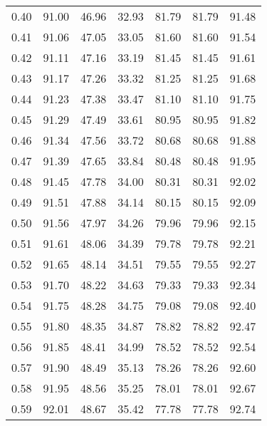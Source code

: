 \begin{tabular}{|c|c|c|c|c|c|c|}
      0.40 &     91.00 &     46.96 &      32.93 &   81.79 &      81.79 &         91.48 \\
      0.41 &     91.06 &     47.05 &      33.05 &   81.60 &      81.60 &         91.54 \\
      0.42 &     91.11 &     47.16 &      33.19 &   81.45 &      81.45 &         91.61 \\
      0.43 &     91.17 &     47.26 &      33.32 &   81.25 &      81.25 &         91.68 \\
      0.44 &     91.23 &     47.38 &      33.47 &   81.10 &      81.10 &         91.75 \\
      0.45 &     91.29 &     47.49 &      33.61 &   80.95 &      80.95 &         91.82 \\
      0.46 &     91.34 &     47.56 &      33.72 &   80.68 &      80.68 &         91.88 \\
      0.47 &     91.39 &     47.65 &      33.84 &   80.48 &      80.48 &         91.95 \\
      0.48 &     91.45 &     47.78 &      34.00 &   80.31 &      80.31 &         92.02 \\
      0.49 &     91.51 &     47.88 &      34.14 &   80.15 &      80.15 &         92.09 \\
      0.50 &     91.56 &     47.97 &      34.26 &   79.96 &      79.96 &         92.15 \\
      0.51 &     91.61 &     48.06 &      34.39 &   79.78 &      79.78 &         92.21 \\
      0.52 &     91.65 &     48.14 &      34.51 &   79.55 &      79.55 &         92.27 \\
      0.53 &     91.70 &     48.22 &      34.63 &   79.33 &      79.33 &         92.34 \\
      0.54 &     91.75 &     48.28 &      34.75 &   79.08 &      79.08 &         92.40 \\
      0.55 &     91.80 &     48.35 &      34.87 &   78.82 &      78.82 &         92.47 \\
      0.56 &     91.85 &     48.41 &      34.99 &   78.52 &      78.52 &         92.54 \\
      0.57 &     91.90 &     48.49 &      35.13 &   78.26 &      78.26 &         92.60 \\
      0.58 &     91.95 &     48.56 &      35.25 &   78.01 &      78.01 &         92.67 \\
      0.59 &     92.01 &     48.67 &      35.42 &   77.78 &      77.78 &         92.74 \\

\end{tabular}
